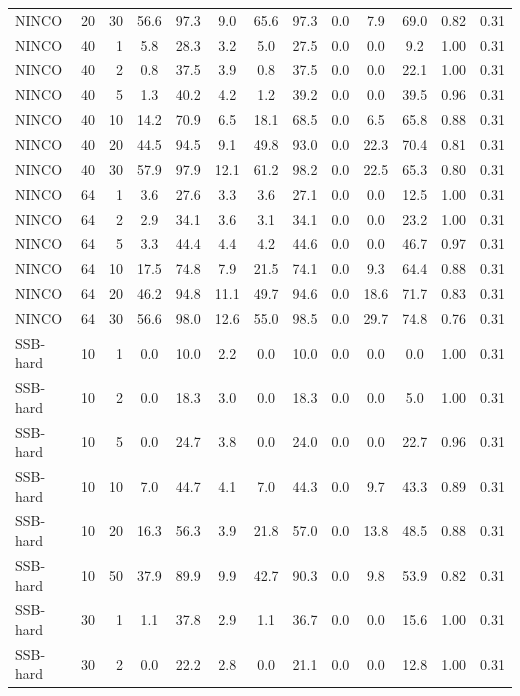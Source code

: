 {\begin{tabular}{@{}lrr|ccc|cc|ccccc@{}}
NINCO & 20 & 30 & 56.6 & 97.3 & 9.0 & 65.6 & 97.3 & 0.0 & 7.9 & 69.0 & 0.82 & 0.31 \\
NINCO & 40 & 1 & 5.8 & 28.3 & 3.2 & 5.0 & 27.5 & 0.0 & 0.0 & 9.2 & 1.00 & 0.31 \\
NINCO & 40 & 2 & 0.8 & 37.5 & 3.9 & 0.8 & 37.5 & 0.0 & 0.0 & 22.1 & 1.00 & 0.31 \\
NINCO & 40 & 5 & 1.3 & 40.2 & 4.2 & 1.2 & 39.2 & 0.0 & 0.0 & 39.5 & 0.96 & 0.31 \\
NINCO & 40 & 10 & 14.2 & 70.9 & 6.5 & 18.1 & 68.5 & 0.0 & 6.5 & 65.8 & 0.88 & 0.31 \\
NINCO & 40 & 20 & 44.5 & 94.5 & 9.1 & 49.8 & 93.0 & 0.0 & 22.3 & 70.4 & 0.81 & 0.31 \\
NINCO & 40 & 30 & 57.9 & 97.9 & 12.1 & 61.2 & 98.2 & 0.0 & 22.5 & 65.3 & 0.80 & 0.31 \\
NINCO & 64 & 1 & 3.6 & 27.6 & 3.3 & 3.6 & 27.1 & 0.0 & 0.0 & 12.5 & 1.00 & 0.31 \\
NINCO & 64 & 2 & 2.9 & 34.1 & 3.6 & 3.1 & 34.1 & 0.0 & 0.0 & 23.2 & 1.00 & 0.31 \\
NINCO & 64 & 5 & 3.3 & 44.4 & 4.4 & 4.2 & 44.6 & 0.0 & 0.0 & 46.7 & 0.97 & 0.31 \\
NINCO & 64 & 10 & 17.5 & 74.8 & 7.9 & 21.5 & 74.1 & 0.0 & 9.3 & 64.4 & 0.88 & 0.31 \\
NINCO & 64 & 20 & 46.2 & 94.8 & 11.1 & 49.7 & 94.6 & 0.0 & 18.6 & 71.7 & 0.83 & 0.31 \\
NINCO & 64 & 30 & 56.6 & 98.0 & 12.6 & 55.0 & 98.5 & 0.0 & 29.7 & 74.8 & 0.76 & 0.31 \\
SSB-hard & 10 & 1 & 0.0 & 10.0 & 2.2 & 0.0 & 10.0 & 0.0 & 0.0 & 0.0 & 1.00 & 0.31 \\
SSB-hard & 10 & 2 & 0.0 & 18.3 & 3.0 & 0.0 & 18.3 & 0.0 & 0.0 & 5.0 & 1.00 & 0.31 \\
SSB-hard & 10 & 5 & 0.0 & 24.7 & 3.8 & 0.0 & 24.0 & 0.0 & 0.0 & 22.7 & 0.96 & 0.31 \\
SSB-hard & 10 & 10 & 7.0 & 44.7 & 4.1 & 7.0 & 44.3 & 0.0 & 9.7 & 43.3 & 0.89 & 0.31 \\
SSB-hard & 10 & 20 & 16.3 & 56.3 & 3.9 & 21.8 & 57.0 & 0.0 & 13.8 & 48.5 & 0.88 & 0.31 \\
SSB-hard & 10 & 50 & 37.9 & 89.9 & 9.9 & 42.7 & 90.3 & 0.0 & 9.8 & 53.9 & 0.82 & 0.31 \\
SSB-hard & 30 & 1 & 1.1 & 37.8 & 2.9 & 1.1 & 36.7 & 0.0 & 0.0 & 15.6 & 1.00 & 0.31 \\
SSB-hard & 30 & 2 & 0.0 & 22.2 & 2.8 & 0.0 & 21.1 & 0.0 & 0.0 & 12.8 & 1.00 & 0.31 \\

\end{tabular}}
